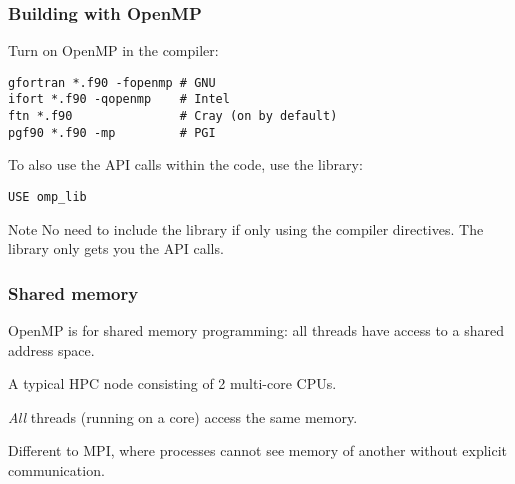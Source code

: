 \documentclass{beamer}
\begin{document}
\begin{frame}[fragile]
\frametitle{Building with OpenMP}

Turn on OpenMP in the compiler:
\begin{verbatim}
gfortran *.f90 -fopenmp # GNU
ifort *.f90 -qopenmp    # Intel
ftn *.f90               # Cray (on by default)
pgf90 *.f90 -mp         # PGI
\end{verbatim}

To also use the API calls within the code, use the library:
\begin{verbatim}
USE omp_lib
\end{verbatim}

\begin{alertblock}{Note}
No need to include the library if only using the compiler directives.
The library only gets you the API calls.
\end{alertblock}
\end{frame}

\begin{frame}
\frametitle{Shared memory}
OpenMP is for shared memory programming: all threads have access to a shared address space.

A typical HPC node consisting of 2 multi-core CPUs.
\begin{center}
\end{center}
\emph{All} threads (running on a core) access the same memory.

Different to MPI, where processes cannot see memory of another without explicit communication.

\end{frame}
\end{document}
